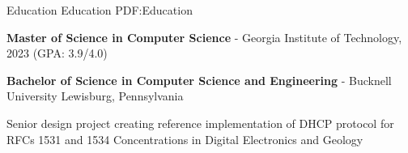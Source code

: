 \documentclass[MMMMyyyy,nonstopmode]{simpleresumecv_stacked}
\newif\ifLOCATION
\newif\ifNOTSELECTED
\begin{document}
\begin{Body}

\ifNOTSELECTED
\begin{Detail}
Created applications to build DSL circuits and track sales commissions in Java and SQL.
\end{Detail}
\fi %

\ifNOTSELECTED
\Gap
\Entry
\textbf{Senior Software Engineer}, Global Crossing/Level3

\begin{Detail}
Led multi-site teams to create telecom applications in Java and SQL.
\end{Detail}
\fi %

\ifNOTSELECTED
\begin{Detail}
Created trading systems for equity derivatives and HFT trading desks in C, C++, and Excel.
\end{Detail}
\fi %

\ifNOTSELECTED
\begin{Detail}
Developed systems for MBS mortgage, Treasury, and Repo trading desks in C and C++.
\end{Detail}
\fi %
\fi %
%

\Section
{Education}
{Education}
{PDF:Education}

\Entry
\textbf{Master of Science in Computer Science} -
Georgia Institute of Technology, 2023 (GPA: 3.9/4.0)

\ifNOTSELECTED %
\BulletItem
Coursework: Compiler Optimization, CPU Architecture, LLVM Software Analysis, Applied ML and AI
\fi %

\iftrue %

\Entry
\textbf{Bachelor of Science in Computer Science and Engineering} - 
Bucknell University
\ifLOCATION
\hfill Lewisburg, Pennsylvania
\fi

\iffalse
\hfill
\DatestampYM{1988}{09} --
\DatestampYM{1992}{06}
\fi
\iffalse %
\begin{Detail}
\BulletItem
Senior design project creating reference implementation of DHCP protocol for RFCs 1531 and 1534
\BulletItem
Concentrations in Digital Electronics and Geology


\end{Detail}
\end{Body}
\end{document}
